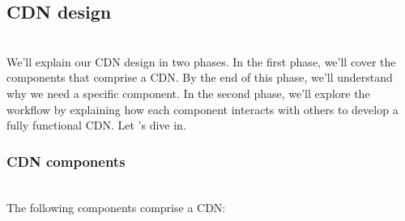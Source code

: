 

\subsection{CDN design}\label{d11H4s3yYA4u1yAulvVrq}
\\
We'll explain our CDN design in two phases. In the first phase, we'll cover the components that comprise a CDN. By the end of this phase, we'll understand why we need a specific component. In the second phase, we'll explore the workflow by explaining how each component interacts with others to develop a fully functional CDN. Let 's dive in.

\subsubsection{CDN components}\label{zifrggvnSXnm4aYOWEA_T}
\\
The following components comprise a CDN:

